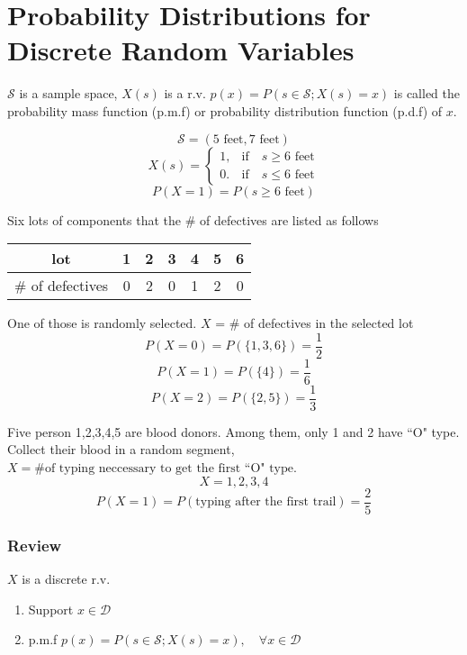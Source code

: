 \section{Probability Distributions for Discrete Random Variables}

\begin{defn}

$\mathcal{S}$ is a sample space, $X(s)$ is a r.v. $p(x)=P(s\in \mathcal{S};X(s)= x) $ is called the probability mass function (p.m.f) or probability distribution function (p.d.f) of $x$.
\end{defn}

\begin{exmp}
\[	\mathcal{S}=(5 \text{ feet}, 7 \text{ feet} )		\]
\[	X(s)=\begin{cases}
1, & \text{if} \quad s\geq 6 \text{ feet} \\
0. & \text{if} \quad s\leq 6 \text{ feet}
\end{cases}		\]
\[	P(X=1)=P(s \geq 6 \text{ feet})\]
\end{exmp}

\begin{exmp}
Six lots of components that the \# of defectives are listed as follows
\begin{center}
\begin{tabular}{c|cccccc}
\hline
lot				& 1 & 2 & 3 & 4 & 5 & 6 \\
\hline
\# of defectives& 0 & 2 & 0 & 1 & 2 & 0 \\
\hline
\end{tabular}
\end{center}

One of those is randomly selected. $X$ = \# of defectives in the selected lot
\[	P(X=0)=P(\{1,3,6\})=\frac{1}{2}		\]
\[	P(X=1)=P(\{4\})=\frac{1}{6}			\]
\[	P(X=2)=P(\{2,5\})=\frac{1}{3}		\]
\end{exmp}

\begin{exmp}
Five person 1,2,3,4,5 are blood donors. Among them, only 1 and 2 have ``O" type. Collect their blood in a random segment, $X=\text{\# of typing neccessary to get the first ``O" type}$.
\[	X = 1,2,3,4		\]
\[	P(X=1)=P(\text{typing after the first trail})=\frac{2}{5} \]
\end{exmp}

\subsubsection{Review}
$X$ is a discrete r.v.
\begin{enumerate}
\item Support $x \in \mathcal{D}$
\item p.m.f $p(x)=P(s\in \mathcal{S};X(s)= x), \quad\forall x \in \mathcal{D}$
\end{enumerate}


